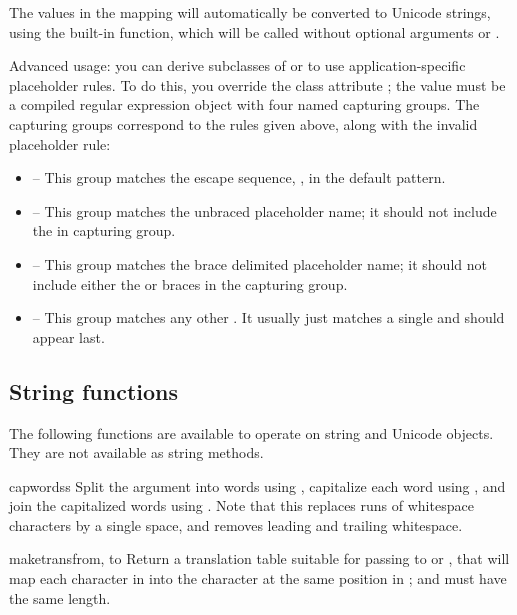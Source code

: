 The values in the mapping will automatically be converted to Unicode strings,
using the built-in  function, which will be called without
optional arguments  or .

Advanced usage: you can derive subclasses of  or
 to use application-specific placeholder rules.  To do
this, you override the class attribute ; the value must be a
compiled regular expression object with four named capturing groups.  The
capturing groups correspond to the rules given above, along with the invalid
placeholder rule:

\begin{itemize}
\item {} -- This group matches the escape sequence, \samp{\$\$},
      in the default pattern.
\item {} -- This group matches the unbraced placeholder name; it
      should not include the \samp{\$} in capturing group.
\item {} -- This group matches the brace delimited placeholder name;
      it should not include either the \samp{\$} or braces in the capturing
      group.
\item {} -- This group matches any other \samp{\$}.  It usually just
      matches a single \samp{\$} and should appear last.
\end{itemize}

\subsection{String functions}

The following functions are available to operate on string and Unicode
objects.  They are not available as string methods.

\begin{funcdesc}{capwords}{s}
  Split the argument into words using , capitalize
  each word using , and join the capitalized
  words using .  Note that this replaces runs of
  whitespace characters by a single space, and removes leading and
  trailing whitespace.
\end{funcdesc}

\begin{funcdesc}{maketrans}{from, to}
  Return a translation table suitable for passing to
   or , that will map
  each character in  into the character at the same position
  in ;  and  must have the same length.

\end{funcdesc}

